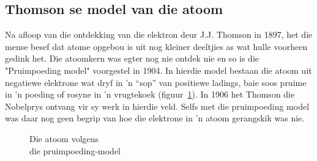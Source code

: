       \label{m38756*uid1}
            \subsection*{Thomson se model van die atoom}
            \nopagebreak
\begin{minipage}{.5\textwidth}
        \label{m38756*id254616}
Na afloop van die ontdekking van die elektron deur J.J. Thomson in 1897, het die mense besef dat atome opgebou is uit nog kleiner deeltjies as wat hulle voorheen gedink het. Die atoomkern was egter nog nie ontdek nie en so is die "Pruimpoeding model" voorgestel in 1904. In hierdie model bestaan die atoom uit negatiewe elektrone wat dryf in  'n “sop” van positiewe ladings, baie soos pruime in 'n poeding of rosyne in 'n vrugtekoek (figuur~\ref{fig:atom:plumpudding}). In 1906 het Thomson die Nobelprys ontvang vir sy werk in hierdie veld. Selfs met die pruimpoeding model was daar nog geen begrip van hoe die elektrone in  'n atoom gerangskik was nie.\\ 
\end{minipage}
\begin{minipage}{.5\textwidth}
	\begin{figure}[H] %
    \begin{center}
\begin{minipage}{.8\textwidth}
\caption{Die atoom volgens \\ die pruimpoeding-model}
\end{minipage}
\label{fig:atom:plumpudding}
\end{center}
 \end{figure}    
\end{minipage}   
      

